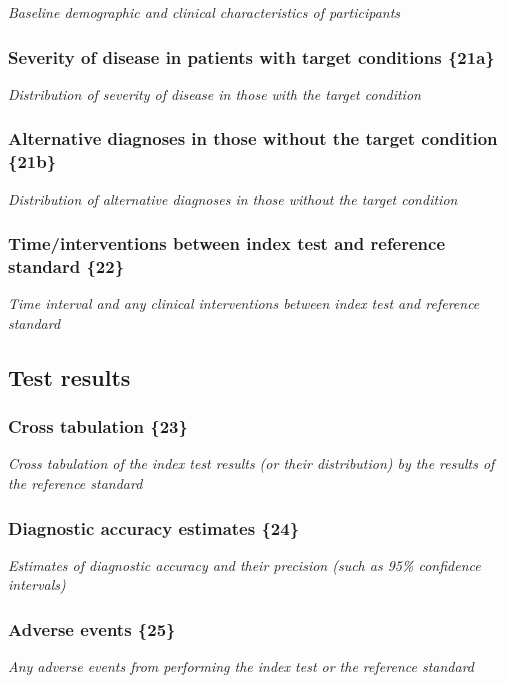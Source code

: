{\em Baseline demographic and clinical characteristics of participants}

\subsubsection{Severity of disease in patients with target conditions \{21a\}}

{\em Distribution of severity of disease in those with the target condition}

\subsubsection{Alternative diagnoses in those without the target
  condition \{21b\}}

{\em Distribution of alternative diagnoses in those without the target
  condition}

\subsubsection{Time/interventions between index test and reference
  standard \{22\}}

{\em Time interval and any clinical interventions between index test
  and reference standard}

\subsection{Test results}

\subsubsection{Cross tabulation \{23\}}

{\em Cross tabulation of the index test results (or their distribution) by
the results of the reference standard}

\subsubsection{Diagnostic accuracy estimates \{24\}}

{\em Estimates of diagnostic accuracy and their precision (such as 95\%
confidence intervals)}

\subsubsection{Adverse events \{25\}}

{\em Any adverse events from performing the index test or the
  reference standard}

